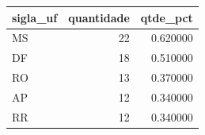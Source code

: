 \begin{tabular}{lrr}
\toprule
sigla_uf & quantidade & qtde_pct \\
\midrule
MS & 22 & 0.620000 \\
DF & 18 & 0.510000 \\
RO & 13 & 0.370000 \\
AP & 12 & 0.340000 \\
RR & 12 & 0.340000 \\
\bottomrule
\end{tabular}
